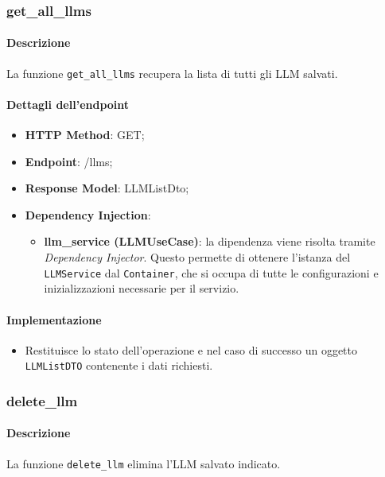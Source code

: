 \subsubsection{get\_all\_llms}
\label{sec:get_all_llms}

\paragraph{Descrizione}
La funzione \texttt{get\_all\_llms} recupera la lista di tutti gli LLM salvati.

\paragraph{Dettagli dell'endpoint}
\begin{itemize}
    \item \textbf{HTTP Method}: GET;
    \item \textbf{Endpoint}: /llms;
    \item \textbf{Response Model}: LLMListDto;
    \item \textbf{Dependency Injection}:
    \begin{itemize}
        \item \textbf{llm\_service (LLMUseCase)}: la dipendenza viene risolta tramite \textit{Dependency Injector}. Questo permette di ottenere l'istanza del \texttt{LLMService} dal \texttt{Container}, che si occupa di tutte le configurazioni e inizializzazioni necessarie per il servizio.
    \end{itemize}
\end{itemize}

\paragraph{Implementazione}
\begin{itemize}
    \item Restituisce lo stato dell'operazione e nel caso di successo un oggetto \texttt{LLMListDTO} contenente i dati richiesti.
\end{itemize}



\subsubsection{delete\_llm}
\label{sec:delete_llm}

\paragraph{Descrizione}
La funzione \texttt{delete\_llm} elimina l'LLM salvato indicato.

